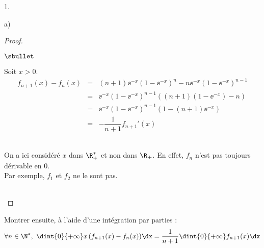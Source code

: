 \documentclass[11pt]{article}%
\begin{document}
\begin{noliste}{1.}
\begin{noliste}{a)}
\begin{proof}
\begin{noliste}{$\sbullet$}
    \item Soit $x>0$.
    \[
      \begin{array}{rcl}
       f_{n+1}(x)-f_n(x) & = & (n+1)\ee^{-x}(1-\ee^{-x})^n - 
       n\ee^{-x}(1-\ee^{-x})^{n-1}
       \\[.2cm]
       & = & \ee^{-x}(1-\ee^{-x})^{n-1}((n+1)(1-\ee^{-x}) - n)
       \\[.2cm]
       & = & \ee^{-x}(1-\ee^{-x})^{n-1}(1-(n+1)\ee^{-x})
       \\[.2cm]
       & = & -\dfrac{1}{n+1} f_{n+1}'(x)
      \end{array} 
    \]
   \end{noliste}
   
 \begin{remark}~\\
   On a ici considéré $x$ dans $\R_+^*$ et non dans $\R_+$. En effet,
   $f_n$ n'est pas toujours dérivable en $0$.\\
   Par exemple, $f_1$ et $f_2$ ne le sont pas.
 \end{remark}~\\[-1.4cm]
\end{proof}
  

\newpage
  

\item Montrer ensuite, à l'aide d'une intégration par parties :
  \[
  \forall n\in\N^*, \ \dint{0}{+\infty} x \, (f_{n+1}(x)-f_n(x)) \dx 
  = \dfrac{1}{n+1} \dint{0}{+\infty} f_{n+1}(x) \dx
  \]
  

\end{noliste}
\end{noliste}
\end{document}
